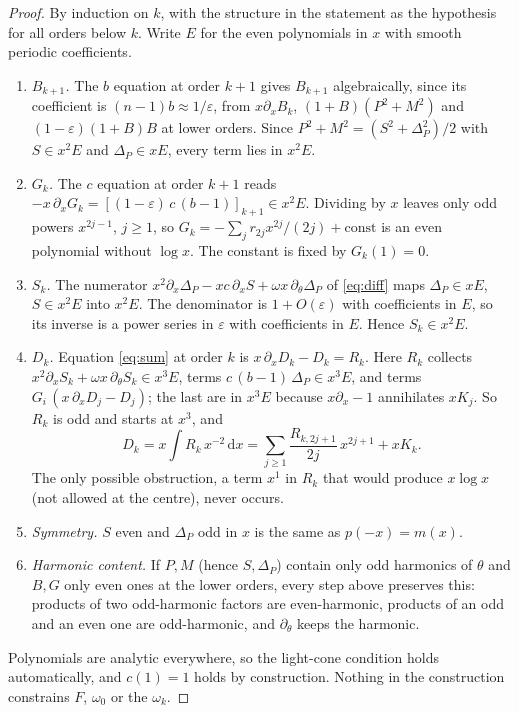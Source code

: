 \documentclass{amsart}
\numberwithin{equation}{section}
\theoremstyle{plain}
\theoremstyle{definition}
\theoremstyle{remark}
\newcommand{\eps}{\varepsilon}
\newcommand{\dd}{\mathrm{d}}
\begin{document}
\begin{proof}
By induction on $k$, with the structure in the statement as the hypothesis for all orders below $k$. Write $E$ for the
even polynomials in $x$ with smooth periodic coefficients.
\begin{enumerate}[label=(\arabic*),leftmargin=2em]
\item \emph{$B_{k+1}$.} The $b$ equation at order $k+1$ gives $B_{k+1}$ algebraically, since its coefficient is
$(n-1)b \approx 1/\eps$, from $x\partial_x B_k$, $(1+B)(P^2+M^2)$ and $(1-\eps)(1+B)B$ at lower orders. Since
$P^2 + M^2 = (S^2 + \Delta_P^2)/2$ with $S \in x^2E$ and $\Delta_P \in xE$, every term lies in $x^2E$.
\item \emph{$G_k$.} The $c$ equation at order $k+1$ reads $-x\,\partial_x G_k = [(1-\eps)\,c\,(b-1)]_{k+1} \in x^2E$.
Dividing by $x$ leaves only odd powers $x^{2j-1}$, $j \ge 1$, so $G_k = -\sum_j r_{2j}x^{2j}/(2j) + \text{const}$ is an
even polynomial without $\log x$. The constant is fixed by $G_k(1) = 0$.
\item \emph{$S_k$.} The numerator $x^2\partial_x\Delta_P - xc\,\partial_x S + \omega x\,\partial_\theta\Delta_P$ of
\eqref{eq:diff} maps $\Delta_P \in xE$, $S \in x^2E$ into $x^2E$. The denominator is $1 + O(\eps)$ with coefficients in
$E$, so its inverse is a power series in $\eps$ with coefficients in $E$. Hence $S_k \in x^2E$.
\item \emph{$D_k$.} Equation \eqref{eq:sum} at order $k$ is $x\,\partial_x D_k - D_k = R_k$. Here $R_k$ collects
$x^2\partial_x S_k + \omega x\,\partial_\theta S_k \in x^3E$, terms $c\,(b-1)\,\Delta_P \in x^3E$, and terms
$G_i\,(x\,\partial_x D_j - D_j)$; the last are in $x^3E$ because $x\partial_x - 1$ annihilates $xK_j$. So $R_k$ is odd and
starts at $x^3$, and
\[
D_k = x\int R_k\,x^{-2}\,\dd x = \sum_{j \ge 1} \frac{R_{k,2j+1}}{2j}\, x^{2j+1} + xK_k .
\]
The only possible obstruction, a term $x^1$ in $R_k$ that would produce $x \log x$ (not allowed at the centre), never
occurs.
\item \emph{Symmetry.} $S$ even and $\Delta_P$ odd in $x$ is the same as $p(-x) = m(x)$.
\item \emph{Harmonic content.} If $P, M$ (hence $S, \Delta_P$) contain only odd harmonics of $\theta$ and $B, G$ only even
ones at the lower orders, every step above preserves this: products of two odd-harmonic factors are even-harmonic,
products of an odd and an even one are odd-harmonic, and $\partial_\theta$ keeps the harmonic.
\end{enumerate}
Polynomials are analytic everywhere, so the light-cone condition holds automatically, and $c(1) = 1$ holds by
construction. Nothing in the construction constrains $F$, $\omega_0$ or the $\omega_k$.
\end{proof}
\end{document}
